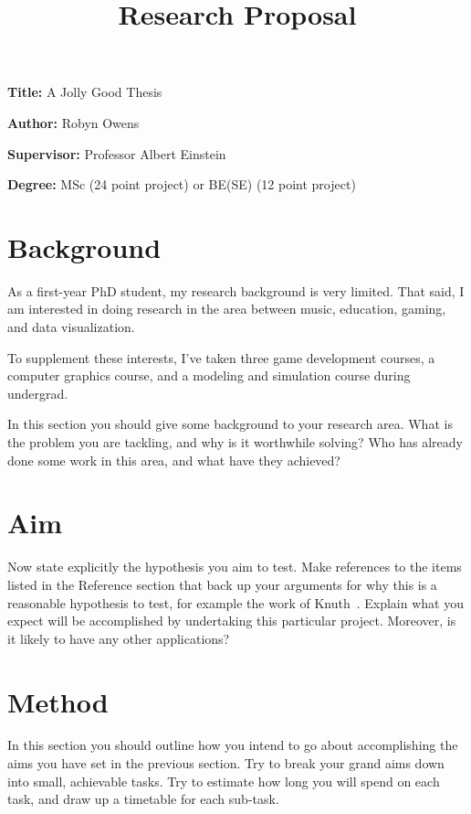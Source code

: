 \documentclass[12pt, a4paper]{article}
\title{Research Proposal}
\author{}
\date{}
\newcommand{\namelistlabel}[1]{\mbox{#1}\hfil}
\newenvironment{namelist}[1]{%
\begin{list}{}
    {
        \let\makelabel\namelistlabel
        \settowidth{\labelwidth}{#1}
        \setlength{\leftmargin}{1.1\labelwidth}
    }
  }{%
\end{list}}
\begin{document}
\maketitle

\begin{namelist}{xxxxxxxxxxxx}
\item[{\bf Title:}]
	A Jolly Good Thesis
\item[{\bf Author:}]
	Robyn Owens
\item[{\bf Supervisor:}]
	Professor Albert Einstein
\item[{\bf Degree:}]
	MSc (24 point project) or BE(SE) (12 point project)
\end{namelist}

\section*{Background}

As a first-year PhD student, my research background is very limited. That said,
I am interested in doing research in the area between music, education, gaming,
and data visualization.

To supplement these interests, I've taken three game development courses, a
computer graphics course, and a modeling and simulation course during undergrad. 

In this section you should give some background to your
research area. What is the problem you are tackling, and why is it
worthwhile solving? Who has already done some work in this area,
and what have they achieved?

\section*{Aim} Now state explicitly the hypothesis you aim to
test. Make references to the items listed in the Reference section
that back up your arguments for why this is a reasonable
hypothesis to test, for example the work of Knuth~\cite{knuth}.
Explain what you expect will be accomplished by undertaking this
particular project.  Moreover, is it likely to have any other
applications?

\section*{Method}
In this section you should outline how you intend to go
about accomplishing the aims you have set in the previous
section. Try to break your grand aims down into small,
achievable tasks. Try to estimate how long you will
spend on each task, and draw up a timetable for each
sub-task.
\end{document}
